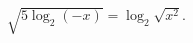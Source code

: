 \begin{ex}[type=equation]
	\begin{condition}
		$\sqrt{5\log_2(-x)} = \log_2\sqrt{x^2}.$
	\end{condition}
\end{ex}